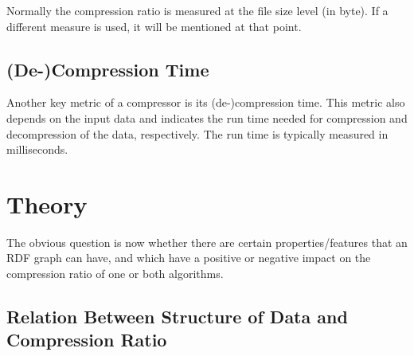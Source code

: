 Normally the compression ratio is measured at the file size level (in byte). If a different measure is used, it will be mentioned at that point.

\subsection{(De-)Compression Time}

Another key metric of a compressor is its (de-)compression time. This metric also depends on the input data and indicates the run time needed for compression and decompression of the data, respectively. The run time is typically measured in milliseconds.

%
%
%

\section{Theory}\label{sec:theory}
The obvious question is now whether there are certain properties/features that an RDF graph can have, and which have a positive or negative impact on the compression ratio of one or both algorithms. 

\subsection{Relation Between Structure of Data and Compression Ratio}

